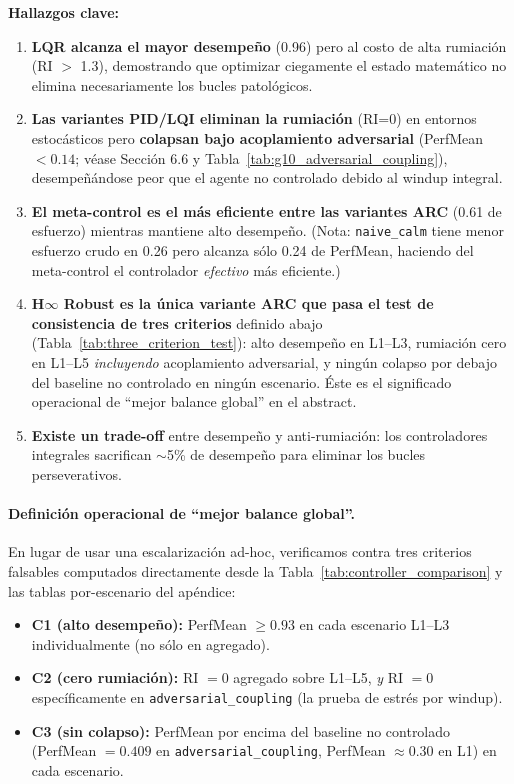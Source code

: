 \documentclass{article}
\begin{document}
\textbf{Hallazgos clave:}
\begin{enumerate}
    \item \textbf{LQR alcanza el mayor desempeño} (0.96) pero al costo de alta rumiación (RI $>$ 1.3), demostrando que optimizar ciegamente el estado matemático no elimina necesariamente los bucles patológicos.
    \item \textbf{Las variantes PID/LQI eliminan la rumiación} (RI=0) en entornos estocásticos pero \textbf{colapsan bajo acoplamiento adversarial} (PerfMean $< 0.14$; véase Sección 6.6 y Tabla~\ref{tab:g10_adversarial_coupling}), desempeñándose peor que el agente no controlado debido al windup integral.
    \item \textbf{El meta-control es el más eficiente entre las variantes ARC} (0.61 de esfuerzo) mientras mantiene alto desempeño. (Nota: \texttt{naive\_calm} tiene menor esfuerzo crudo en 0.26 pero alcanza sólo 0.24 de PerfMean, haciendo del meta-control el controlador \textit{efectivo} más eficiente.)
    \item \textbf{H$\infty$ Robust es la única variante ARC que pasa el test de consistencia de tres criterios} definido abajo (Tabla~\ref{tab:three_criterion_test}): alto desempeño en L1--L3, rumiación cero en L1--L5 \emph{incluyendo} acoplamiento adversarial, y ningún colapso por debajo del baseline no controlado en ningún escenario. Éste es el significado operacional de ``mejor balance global'' en el abstract.
    \item \textbf{Existe un trade-off} entre desempeño y anti-rumiación: los controladores integrales sacrifican $\sim$5\% de desempeño para eliminar los bucles perseverativos.
\end{enumerate}

\paragraph{Definición operacional de ``mejor balance global''.} En lugar de usar una escalarización ad-hoc, verificamos contra tres criterios falsables computados directamente desde la Tabla~\ref{tab:controller_comparison} y las tablas por-escenario del apéndice:
\begin{itemize}
    \item \textbf{C1 (alto desempeño):} PerfMean $\geq 0.93$ en cada escenario L1--L3 individualmente (no sólo en agregado).
    \item \textbf{C2 (cero rumiación):} RI $=0$ agregado sobre L1--L5, \emph{y} RI $=0$ específicamente en \texttt{adversarial\_coupling} (la prueba de estrés por windup).
    \item \textbf{C3 (sin colapso):} PerfMean por encima del baseline no controlado (PerfMean $=0.409$ en \texttt{adversarial\_coupling}, PerfMean $\approx 0.30$ en L1) en cada escenario.
\end{itemize}
\end{document}
